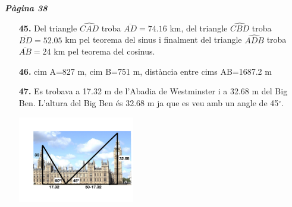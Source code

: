 \documentclass[a4paper, pdf, twoside]{book}
\begin{document}
\begin{multicols}{2}
{\textbf{\em Pàgina 38}} \hrulefill
\begin{enumerate}
\vspace{0.25cm}
\item[\fontfamily{phv}\selectfont\color{blue}\textbf{45. }]  \scalebox{0.6}{\simbolcompass } 
Del triangle $\widehat {CAD}$ troba $\overline {AD}=74.16$ km, del triangle $\widehat {CBD}$ troba $\overline {BD}=52.05$ km pel teorema del sinus i finalment del triangle $\widehat {ADB}$ troba $\overline {AB}=24$ km pel teorema del cosinus.
 \end{enumerate}
\begin{enumerate}
\vspace{0.25cm}
\item[\fontfamily{phv}\selectfont\color{blue}\textbf{46. }]  \scalebox{0.6}{\simbolclau } 
cim A=827 m, cim B=751 m, distància entre cims AB=1687.2 m
\vspace{0.25cm}
\item[\fontfamily{phv}\selectfont\color{blue}\textbf{47. }] 
Es trobava a 17.32 m de l'Abadia de Westminster i a 32.68 m del Big Ben. L'altura del Big Ben és 32.68 m ja que es veu amb un angle de 45$^\circ $. \par \includegraphics [width=0.4\textwidth ]{img-sol/t3-47}
 \end{enumerate}
\vspace{0.3cm}



\end{multicols}
\end{document}
